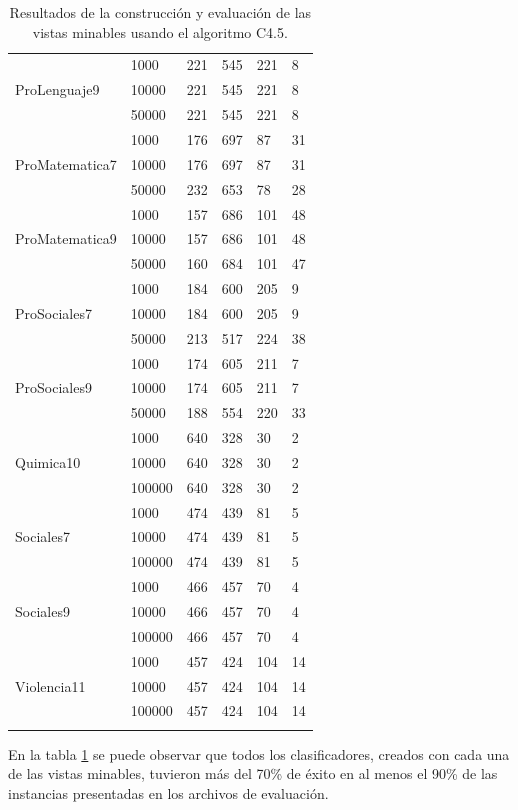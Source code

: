\begin{longtable}{|p{3cm}|p{3cm}|p{2cm}|p{2cm}|p{2cm}|p{2cm}|}
\hline
\multirow{3}[6]{*}{ProLenguaje9} & 1000  & 221   & 545   & 221   & 8 \\
\cline{2-6}      & 10000 & 221   & 545   & 221   & 8 \\
\cline{2-6}      & 50000 & 221   & 545   & 221   & 8 \\
\hline
\multirow{3}[6]{*}{ProMatematica7} & 1000  & 176   & 697   & 87    & 31 \\
\cline{2-6}      & 10000 & 176   & 697   & 87    & 31 \\
\cline{2-6}      & 50000 & 232   & 653   & 78    & 28 \\
\hline
\multirow{3}[6]{*}{ProMatematica9} & 1000  & 157   & 686   & 101   & 48 \\
\cline{2-6}      & 10000 & 157   & 686   & 101   & 48 \\
\cline{2-6}      & 50000 & 160   & 684   & 101   & 47 \\
\hline
\multirow{3}[6]{*}{ProSociales7} & 1000  & 184   & 600   & 205   & 9 \\
\cline{2-6}      & 10000 & 184   & 600   & 205   & 9 \\
\cline{2-6}      & 50000 & 213   & 517   & 224   & 38 \\
\hline
\multirow{3}[6]{*}{ProSociales9} & 1000  & 174   & 605   & 211   & 7 \\
\cline{2-6}      & 10000 & 174   & 605   & 211   & 7 \\
\cline{2-6}      & 50000 & 188   & 554   & 220   & 33 \\
\hline
\multirow{3}[6]{*}{Quimica10} & 1000  & 640   & 328   & 30    & 2 \\
\cline{2-6}      & 10000 & 640   & 328   & 30    & 2 \\
\cline{2-6}      & 100000 & 640   & 328   & 30    & 2 \\
\hline
\multirow{3}[6]{*}{Sociales7} & 1000  & 474   & 439   & 81    & 5 \\
\cline{2-6}      & 10000 & 474   & 439   & 81    & 5 \\
\cline{2-6}      & 100000 & 474   & 439   & 81    & 5 \\
\hline
\multirow{3}[6]{*}{Sociales9} & 1000  & 466   & 457   & 70    & 4 \\
\cline{2-6}      & 10000 & 466   & 457   & 70    & 4 \\
\cline{2-6}      & 100000 & 466   & 457   & 70    & 4 \\
\hline
\multirow{3}[6]{*}{Violencia11} & 1000  & 457   & 424   & 104   & 14 \\
\cline{2-6}      & 10000 & 457   & 424   & 104   & 14 \\
\cline{2-6}      & 100000 & 457   & 424   & 104   & 14 \\
\hline
\caption{Resultados de la construcción y evaluación de las vistas minables usando el algoritmo C4.5.}
\label{tab:cuadro33}
\end{longtable}
En la tabla \ref{tab:cuadro33} se puede observar que todos los clasificadores, creados con cada una de las vistas minables, tuvieron más del 70\% de éxito en al menos el 90\% de las instancias presentadas en los archivos de evaluación.

